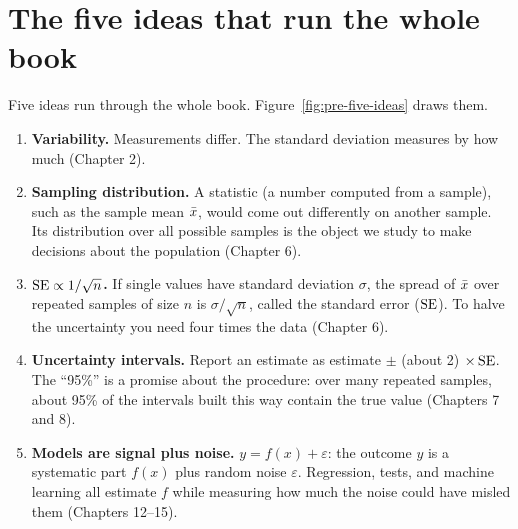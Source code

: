 \section*{The five ideas that run the whole book}

Five ideas run through the whole book.
Figure~\ref{fig:pre-five-ideas} draws them.

\begin{enumerate}
  \item \textbf{Variability.} Measurements differ. The standard deviation
    measures by how much (Chapter 2).
  \item \textbf{Sampling distribution.} A statistic (a number computed from a sample),
    such as the sample mean $\bar{x}$, would come out differently on another
    sample. Its distribution over all possible samples is the object we study to make decisions about the population (Chapter 6).
  \item \textbf{$\operatorname{SE} \propto 1/\sqrt{n}$.} If single values have standard
    deviation $\sigma$, the spread of $\bar{x}$ over repeated samples of size
    $n$ is $\sigma/\sqrt{n}$, called the standard error ($\operatorname{SE}$). To halve the
    uncertainty you need four times the data (Chapter 6).
  \item \textbf{Uncertainty intervals.} Report an estimate as
    estimate $\pm$ (about 2) $\times \operatorname{SE}$. The ``95\%'' is a promise about
    the procedure: over many repeated samples, about 95\% of the intervals
    built this way contain the true value (Chapters 7 and 8).
  \item \textbf{Models are signal plus noise.} $y = f(x) + \varepsilon$: the
    outcome $y$ is a systematic part $f(x)$ plus random noise $\varepsilon$.
    Regression, tests, and machine learning all estimate $f$ while measuring how much the
    noise could have misled them (Chapters 12--15).
\end{enumerate}

